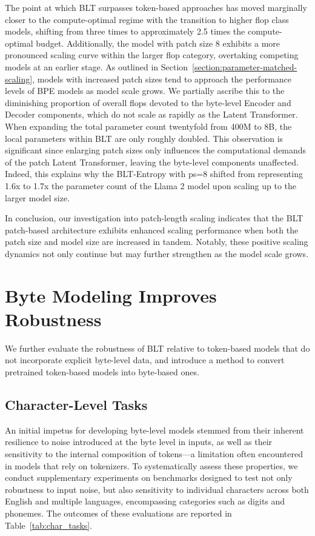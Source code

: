The point at which {\textsc BLT} surpasses token-based approaches has moved marginally closer to the compute-optimal regime with the transition to higher flop class models, shifting from three times to approximately 2.5 times the compute-optimal budget. Additionally, the model with patch size 8 exhibits a more pronounced scaling curve within the larger flop category, overtaking competing models at an earlier stage. As outlined in Section~\ref{section:parameter-matched-scaling}, models with increased patch sizes tend to approach the performance levels of BPE models as model scale grows. We partially ascribe this to the diminishing proportion of overall flops devoted to the byte-level Encoder and Decoder components, which do not scale as rapidly as the Latent Transformer. When expanding the total parameter count twentyfold from 400M to 8B, the local parameters within {\textsc BLT} are only roughly doubled. This observation is significant since enlarging patch sizes only influences the computational demands of the patch Latent Transformer, leaving the byte-level components unaffected. Indeed, this explains why the {\textsc BLT}-Entropy with ps=8 shifted from representing 1.6x to 1.7x the parameter count of the Llama 2 model upon scaling up to the larger model size.

In conclusion, our investigation into patch-length scaling indicates that the {\textsc BLT} patch-based architecture exhibits enhanced scaling performance when both the patch size and model size are increased in tandem. Notably, these positive scaling dynamics not only continue but may further strengthen as the model scale grows.

\section{Byte Modeling Improves Robustness}
We further evaluate the robustness of {\textsc BLT} relative to token-based models that do not incorporate explicit byte-level data, and introduce a method to convert pretrained token-based models into byte-based ones.
\label{sec:robustness}

\subsection{Character-Level Tasks}

An initial impetus for developing byte-level models stemmed from their inherent resilience to noise introduced at the byte level in inputs, as well as their sensitivity to the internal composition of tokens—a limitation often encountered in models that rely on tokenizers. To systematically assess these properties, we conduct supplementary experiments on benchmarks designed to test not only robustness to input noise, but also sensitivity to individual characters across both English and multiple languages, encompassing categories such as digits and phonemes. The outcomes of these evaluations are reported in Table~\ref{tab:char_tasks}.

